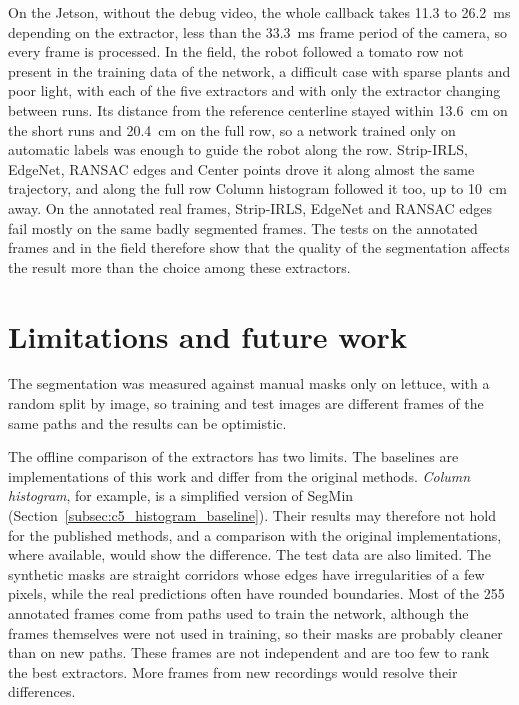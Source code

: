 On the Jetson, without the debug video, the whole callback takes 11.3 to 26.2~ms depending on the extractor, less than the 33.3~ms frame period of the camera, so every frame is processed. In the field, the robot followed a tomato row not present in the training data of the network, a difficult case with sparse plants and poor light, with each of the five extractors and with only the extractor changing between runs. Its distance from the reference centerline stayed within 13.6~cm on the short runs and 20.4~cm on the full row, so a network trained only on automatic labels was enough to guide the robot along the row. Strip-IRLS, EdgeNet, RANSAC edges and Center points drove it along almost the same trajectory, and along the full row Column histogram followed it too, up to 10~cm away. On the annotated real frames, Strip-IRLS, EdgeNet and RANSAC edges fail mostly on the same badly segmented frames. The tests on the annotated frames and in the field therefore show that the quality of the segmentation affects the result more than the choice among these extractors.

\section{Limitations and future work}
\label{sec:limitations_future}

The segmentation was measured against manual masks only on lettuce, with a random split by image, so training and test images are different frames of the same paths and the results can be optimistic.

The offline comparison of the extractors has two limits. The baselines are implementations of this work and differ from the original methods. \textit{Column histogram}, for example, is a simplified version of SegMin (Section~\ref{subsec:c5_histogram_baseline}). Their results may therefore not hold for the published methods, and a comparison with the original implementations, where available, would show the difference. The test data are also limited. The synthetic masks are straight corridors whose edges have irregularities of a few pixels, while the real predictions often have rounded boundaries. Most of the 255 annotated frames come from paths used to train the network, although the frames themselves were not used in training, so their masks are probably cleaner than on new paths. These frames are not independent and are too few to rank the best extractors. More frames from new recordings would resolve their differences.

